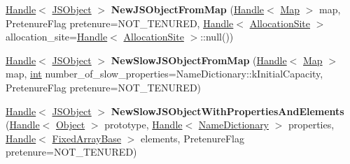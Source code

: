 \begin{DoxyCompactItemize}
\mbox{\label{classv8_1_1internal_1_1Factory_a0ab5a6fd26fd9f07799cecf3f34e1ab8}} 
\mbox{\hyperlink{classv8_1_1internal_1_1Handle}{Handle}}$<$ \mbox{\hyperlink{classv8_1_1internal_1_1JSObject}{J\+S\+Object}} $>$ {\bfseries New\+J\+S\+Object\+From\+Map} (\mbox{\hyperlink{classv8_1_1internal_1_1Handle}{Handle}}$<$ \mbox{\hyperlink{classv8_1_1internal_1_1Map}{Map}} $>$ map, Pretenure\+Flag pretenure=N\+O\+T\+\_\+\+T\+E\+N\+U\+R\+ED, \mbox{\hyperlink{classv8_1_1internal_1_1Handle}{Handle}}$<$ \mbox{\hyperlink{classv8_1_1internal_1_1AllocationSite}{Allocation\+Site}} $>$ allocation\+\_\+site=\mbox{\hyperlink{classv8_1_1internal_1_1Handle}{Handle}}$<$ \mbox{\hyperlink{classv8_1_1internal_1_1AllocationSite}{Allocation\+Site}} $>$\+::null())
\item 
\mbox{\label{classv8_1_1internal_1_1Factory_a1661a54d5143d083e84a0a8b3f88105e}} 
\mbox{\hyperlink{classv8_1_1internal_1_1Handle}{Handle}}$<$ \mbox{\hyperlink{classv8_1_1internal_1_1JSObject}{J\+S\+Object}} $>$ {\bfseries New\+Slow\+J\+S\+Object\+From\+Map} (\mbox{\hyperlink{classv8_1_1internal_1_1Handle}{Handle}}$<$ \mbox{\hyperlink{classv8_1_1internal_1_1Map}{Map}} $>$ map, \mbox{\hyperlink{classint}{int}} number\+\_\+of\+\_\+slow\+\_\+properties=Name\+Dictionary\+::k\+Initial\+Capacity, Pretenure\+Flag pretenure=N\+O\+T\+\_\+\+T\+E\+N\+U\+R\+ED)
\item 
\mbox{\label{classv8_1_1internal_1_1Factory_a1ee83a18daa8743010fa3aa72e6ffbbb}} 
\mbox{\hyperlink{classv8_1_1internal_1_1Handle}{Handle}}$<$ \mbox{\hyperlink{classv8_1_1internal_1_1JSObject}{J\+S\+Object}} $>$ {\bfseries New\+Slow\+J\+S\+Object\+With\+Properties\+And\+Elements} (\mbox{\hyperlink{classv8_1_1internal_1_1Handle}{Handle}}$<$ \mbox{\hyperlink{classv8_1_1internal_1_1Object}{Object}} $>$ prototype, \mbox{\hyperlink{classv8_1_1internal_1_1Handle}{Handle}}$<$ \mbox{\hyperlink{classv8_1_1internal_1_1NameDictionary}{Name\+Dictionary}} $>$ properties, \mbox{\hyperlink{classv8_1_1internal_1_1Handle}{Handle}}$<$ \mbox{\hyperlink{classv8_1_1internal_1_1FixedArrayBase}{Fixed\+Array\+Base}} $>$ elements, Pretenure\+Flag pretenure=N\+O\+T\+\_\+\+T\+E\+N\+U\+R\+ED)
\item 
\mbox{\label{classv8_1_1internal_1_1Factory_a502d4219fa2b72e57a28c2fbd4b0effe}} 

\end{DoxyCompactItemize}
